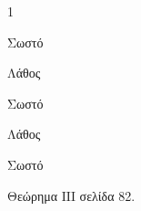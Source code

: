 \begin{ylh}{1}
    \begin{alist}
        \item 
            \begin{rlist}
                \item Σωστό
                \item Λάθος
                \item Σωστό
                \item Λάθος
                \item Σωστό
            \end{rlist}
        \item Θεώρημα ΙΙΙ σελίδα 82.
    \end{alist}
\end{ylh}